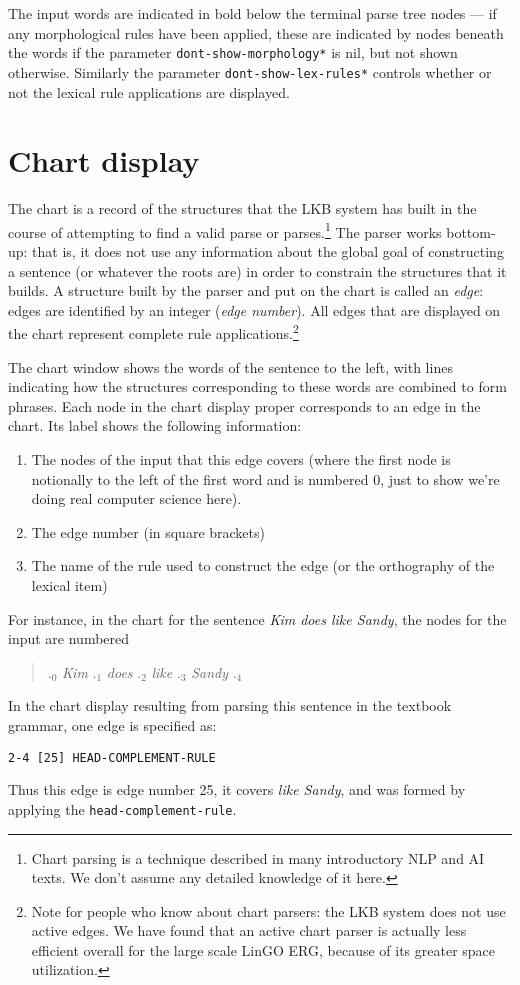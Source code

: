 \documentclass[12pt]{report}
\begin{document}
The input words are 
indicated in bold below the terminal parse tree nodes --- if any morphological
rules have been applied, these are indicated by nodes beneath the words
if the parameter {\tt *dont-show-morphology*} is nil, but not shown otherwise.
Similarly the parameter {\tt *dont-show-lex-rules*} controls whether or
not the lexical rule applications are displayed.

\section{Chart display}
\label{chart}

The chart is a record of the structures that the LKB system has built in
the course of attempting to find a valid parse or parses.\footnote{Chart
parsing is a technique
described in many introductory NLP and AI texts.  We don't assume any
detailed knowledge of it here.}
The parser works bottom-up: that is, it does not use any
information about the global goal of constructing a sentence (or
whatever the roots are) in order to constrain the structures that it
builds.  A structure built by the parser and put on the
chart is called an {\it edge}: edges are identified by an
integer ({\it edge number}).
All edges that are displayed on the chart 
represent complete rule applications.\footnote{Note for people
who know about chart parsers: the LKB system does not
use active edges.  We have found that an active chart parser 
is actually less efficient overall for the large scale LinGO ERG,
because of its greater space utilization.}

The chart window shows the words of the sentence to the left,
with lines indicating how the structures corresponding to these words
are combined to form phrases.  Each node in the chart display proper
corresponds to an edge in the chart.
Its label shows the following information:
\begin{enumerate}
\item The nodes of the input that this edge covers (where the first node
is notionally to the left of the first word and
is numbered 0, just to show we're doing real computer science here).
\item The edge number (in square brackets)
\item The name of the rule used to construct the edge
(or the orthography of the lexical item)
\end{enumerate}
For instance, in the chart for the sentence {\it Kim does like Sandy},
the nodes for the input are numbered
\begin{quote}
.$_{0}$ {\it Kim} .$_{1}$ {\it does} .$_{2}$ {\it like} 
.$_{3}$ {\it Sandy} .$_{4}$  
\end{quote}
In the chart display resulting from parsing this sentence 
in the textbook grammar, one edge is specified as:
\begin{verbatim}
2-4 [25] HEAD-COMPLEMENT-RULE
\end{verbatim}
Thus this edge is edge number 25, it covers {\it like Sandy}, 
and was formed by applying the {\tt head-complement-rule}.
\end{document}
